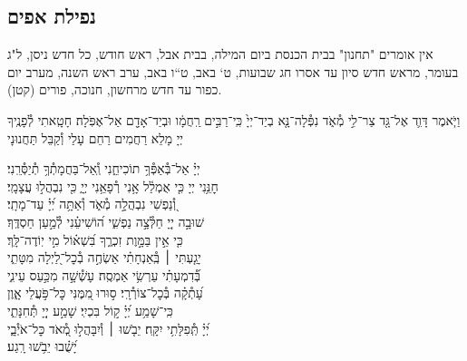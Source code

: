 \documentclass[twoside, openany, parskip=half, 11pt]{book}
\begin{document}
\subsection*{ נפילת אפים }

\newcommand{\nefilasapayim}{

וַיֹּ֧אמֶר דָּוִ֛ד אֶל־גָּ֖ד צַר־לִ֣י מְ֯אֹ֑ד נִפְּ֯לָה־נָּ֤א בְיַד־יְיָ֙ כִּֽי־רַבִּ֣ים רַֽחֲמָ֔ו וּבְיַד־אָדָ֖ם אַל־אֶפֹּֽלָה׃
\firstword{רַחוּם וְ֯חַנּוּן,}
חָטָֽאתִי לְ֯פָנֶֽיךָ יְיָ מָלֵא רַחֲמִים רַחֵם עָלַי וְ֯קַבֵּל תַּחֲנוּנָי
\begin{narrow}
יְיָ֗ אַל־בְּ֯אַפְּ֯ךָ֥ תוֹכִיחֵ֑נִי \hfill וְֽ֯אַל־בַּחֲמָתְ֯ךָ֥ תְ֯יַסְּ֯רֵֽנִי׃ \\
חׇנֵּ֥נִי יְיָ כִּ֤י אֻמְלַ֫ל אָ֥נִי \hfill רְ֯פָאֵ֥נִי יְיָ֑ כִּ֖י נִבְהֲל֣וּ עֲצָמָֽי׃ \\
וְ֭֯נַפְשִׁי נִבְהֲלָ֣ה מְ֯אֹ֑ד \hfill וְ֯אַתָּ֥ה יְ֝יָ֗ עַד־מָתָֽי׃ \\
שׁוּבָ֣ה יְיָ֭ חַלְּ֯צָ֣ה נַפְשִׁ֑י \hfill ה֝וֹשִׁיעֵ֗נִי לְ֯מַ֣עַן חַסְדֶּֽךָ׃ \\
כִּ֤י אֵ֣ין בַּמָּ֣וֶת זִכְרֶ֑ךָ \hfill בִּ֝שְׁא֗וֹל מִ֣י יֽוֹדֶה־לָּֽךְ׃ \\
יָגַ֤עְתִּי ׀ בְּֽ֯אַנְחָתִ֗י \hfill אַשְׂחֶ֣ה בְ֯כׇל־לַ֭יְלָה מִטָּתִ֑י\\ בְּ֯֝דִמְעָתִ֗י עַרְשִׂ֥י אַמְסֶֽה׃ \hfill
עָשְׁ֯שָׁ֣ה מִכַּ֣עַס עֵינִ֑י \\ עָ֝תְ֯קָ֗ה בְּ֯כׇל־צוֹרְ֯רָֽי׃ \hfill
ס֣וּרוּ מִ֭מֶּנִּי כׇּל־פֹּ֣עֲלֵי אָ֑וֶן \\ כִּֽי־שָׁמַ֥ע יְ֝יָ֗ ק֣וֹל בִּכְיִֽי׃ \hfill
שָׁמַ֣ע יְיָ֭ תְּ֯חִנָּתִ֑י \\ יְ֝יָ֗ תְּֽ֯פִלָּתִ֥י יִקָּֽח׃ \hfill
יֵבֹ֤שׁוּ ׀ וְ֯יִבָּהֲל֣וּ מְ֭֯אֹד כׇּל־אֹיְ֯בָ֑י \\ יָ֝שֻׁ֗בוּ יֵבֹ֥שׁוּ רָֽגַע׃ \hfill \break
\end{narrow}\negline
}



\begin{scriptsize}

\textsf{
אין אומרים "תחנון" בבית הכנסת ביום המילה, בבית אבל, ראש חודש, כל חדש ניסן, ל"ג בעומר, מראש חדש סיון עד אסרו חג שבועות, ט` באב, ט``ו באב, ערב ראש השנה, מערב יום כפור עד חדש מרחשון, חנוכה, פורים (קטן).
}

\end{scriptsize}
\nefilasapayim \label{nefilas_apayim}

\negline
\end{document}
